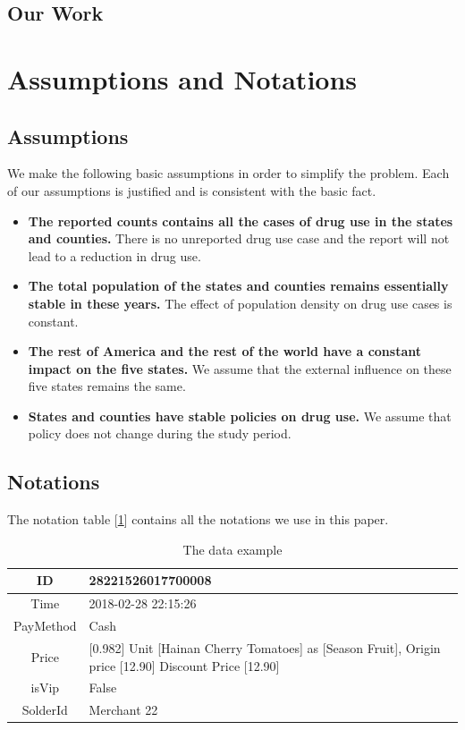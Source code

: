 \documentclass{mcmthesis}
\begin{document}
\subsection{Our Work}


\section{Assumptions and Notations}

\subsection{Assumptions}
We make the following basic assumptions in order to simplify the problem. Each
of our assumptions is justified and is consistent with the basic fact.
\begin{itemize}
	\item \textbf{The reported counts contains all the cases of drug use in the states and counties.} There is no unreported drug use case and the report will not lead to a reduction in drug use.
	\item \textbf{The total population of the states and counties remains essentially stable in these years.} The effect of population density on drug use cases is constant.
	\item \textbf{The rest of America and the rest of the world have a constant impact on the five states.} We assume that the external influence on these five states remains the same.
	\item \textbf{States and counties have stable policies on drug use.} We assume that policy does not change during the study period.
\end{itemize}

\subsection{Notations}
The notation table [\ref{table-notations}] contains all the notations we use in this paper.

\begin{table}[h]
	\centering
	\caption{The data example} \label{table-notations}
	\begin{tabular}{cp{20em}}
		\toprule
		ID & 28221526017700008\\
		\hline
		Time & 2018-02-28 22:15:26\\
		\hline
		PayMethod & Cash\\
		\hline
		Price & [0.982] Unit [Hainan Cherry Tomatoes] as [Season Fruit], Origin price [12.90] Discount Price [12.90]\\
		\hline
		isVip & False\\
		\hline
		SolderId & Merchant 22\\
		\bottomrule
	\end{tabular}
\end{table}
\end{document}
